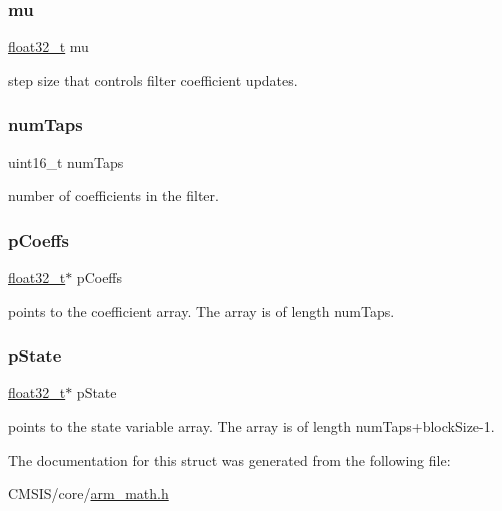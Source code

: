 \subsubsection{\texorpdfstring{mu}{mu}}
{\footnotesize\ttfamily \mbox{\hyperlink{arm__math_8h_a4611b605e45ab401f02cab15c5e38715}{float32\+\_\+t}} mu}

step size that controls filter coefficient updates. \mbox{\label{structarm__lms__instance__f32_a751941891e47f522a7f5375fe8990aac}} 
\subsubsection{\texorpdfstring{numTaps}{numTaps}}
{\footnotesize\ttfamily uint16\+\_\+t num\+Taps}

number of coefficients in the filter. \mbox{\label{structarm__lms__instance__f32_aacbb8dd8eeba4b21fc2bb40076405ee3}} 
\subsubsection{\texorpdfstring{pCoeffs}{pCoeffs}}
{\footnotesize\ttfamily \mbox{\hyperlink{arm__math_8h_a4611b605e45ab401f02cab15c5e38715}{float32\+\_\+t}}$\ast$ p\+Coeffs}

points to the coefficient array. The array is of length num\+Taps. \mbox{\label{structarm__lms__instance__f32_a335c87e6fdc4b96601d95a5de8b9c463}} 
\subsubsection{\texorpdfstring{pState}{pState}}
{\footnotesize\ttfamily \mbox{\hyperlink{arm__math_8h_a4611b605e45ab401f02cab15c5e38715}{float32\+\_\+t}}$\ast$ p\+State}

points to the state variable array. The array is of length num\+Taps+block\+Size-\/1. 

The documentation for this struct was generated from the following file\+:\begin{DoxyCompactItemize}
\item 
C\+M\+S\+I\+S/core/\mbox{\hyperlink{arm__math_8h}{arm\+\_\+math.\+h}}\end{DoxyCompactItemize}
